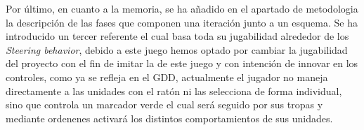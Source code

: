 Por último, en cuanto a la memoria, se ha añadido en el apartado de metodologia la
descripción de las fases que componen una iteración junto a un esquema. Se ha introducido
un tercer referente el cual basa toda su jugabilidad alrededor de los \textit{Steering
behavior}, debido a este juego hemos optado por cambiar la jugabilidad del proyecto
con el fin de imitar la de este juego y con intención de innovar en los controles, como ya se
refleja en el \ac{GDD}, actualmente el jugador no maneja directamente a las unidades con el
ratón ni las selecciona de forma individual, sino que controla un marcador verde el cual será
seguido por sus tropas y mediante ordenenes activará los distintos comportamientos de sus 
unidades. 

